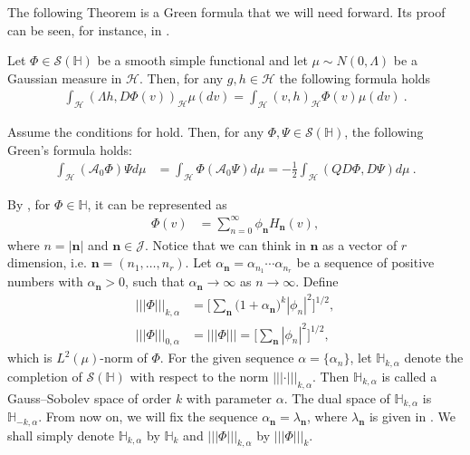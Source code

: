 \documentclass[review,onefignum,onetabnum]{siamart190516}
\begin{document}
The following Theorem is a Green formula that we will need forward.
Its proof can be seen, for instance, in \cite[][Thm. 3.3, Ch. 9]{liu}.

\begin{theorem}\label{green-form}
    Let
    $
        \Phi \in \mathcal{S}(\mathbb{H})
    $ be a smooth simple functional and let
    $\mu\sim N(0,\Lambda)$ be a Gaussian measure in $\mathcal{H}$. Then,
    for any $g,h\in\mathcal{H}$ the following formula holds
    \begin{align}
        \int_{\mathcal{H}} (\Lambda h,D\Phi(v))_{\mathcal{H}}  \mu(dv) =
            \int_{\mathcal{H}} (v,h)_{\mathcal{H}}
            \Phi(v) \mu(dv) \ .
            \label{s2.2.1}
    \end{align}

\end{theorem}

\begin{lemma}
    Assume the conditions for   hold. Then, for any
    $\Phi,\Psi\in \mathcal{S}(\mathbb{H})$, the following Green’s formula holds:
    \begin{align}
         \int_{\mathcal{H}} (\mathcal{A}_0 \Phi)\Psi d\mu &=
             \int_{\mathcal{H}} \Phi(\mathcal{A}_0 \Psi) d\mu=
            -\frac{1}{2}\int_{\mathcal{H}} (QD\Phi, D\Psi) d\mu \ .
    \end{align}

\end{lemma}
By , for $\Phi \in \mathbb{H}$, it can be represented as
\begin{align} \label{s1.4}
    \Phi(v) &=
        \sum_{n=0}^\infty \phi_{\mathbf{n}} H_{\mathbf{n}}(v),
\end{align}
where $n = |\mathbf{n}|$ and $\mathbf{n}\in \mathcal{J}$. Notice that we can
think in $\mathbf{n}$ as a vector of $r$ dimension, i.e.
$\mathbf{n}=(n_1,\ldots,n_r)$.
Let $\alpha_{\mathbf{n}} = \alpha_{n_1}\cdots \alpha_{n_r}$ be a sequence of
positive numbers with $\alpha_{\mathbf{n}} > 0$, such that
$\alpha_{\mathbf{n}} \rightarrow \infty$ as $n \rightarrow \infty$.
Define
\begin{align*}
     |||\Phi|||_{k,\alpha} 
        &= \Bigg[ \sum_{\mathbf{n}}
        \big(
            1 + \alpha_{\mathbf{n}}
        \big) ^ k |\phi_n |^2 \Bigg]^{1/2} ,
    \\
    |||\Phi|||_{0,\alpha} 
        &= |||\Phi|||=\Bigg[ \sum_{\mathbf{n}} |\phi_n|^2
    \Bigg]^{1/2},
\end{align*}
which is $L^2(\mu)$-norm of $\Phi$. For the given sequence
$\alpha = \{\alpha_n \}$, let $\mathbb{H}_{k,\alpha}$ denote
the completion of $\mathcal{S}(\mathbb{H})$ with respect to the norm
$|||\cdot|||_{k,\alpha}$. Then $\mathbb{H}_{k,\alpha}$ is called
a Gauss–Sobolev space of order $k$ with parameter $\alpha$. The dual space of
$\mathbb{H}_{k,\alpha}$ is $\mathbb{H}_{-k,\alpha}$.
From now on, we will fix the sequence $\alpha_{\mathbf{n}} =
\lambda_{\mathbf{n}} $, where $\lambda_{\mathbf{n}} $ is given in
.
We shall simply denote $\mathbb{H}_{k,\alpha}$ by $\mathbb{H}_{k}$ and
$ |||\Phi|||_{k,\alpha}$ by $|||\Phi|||_{k}$.
\end{document}
